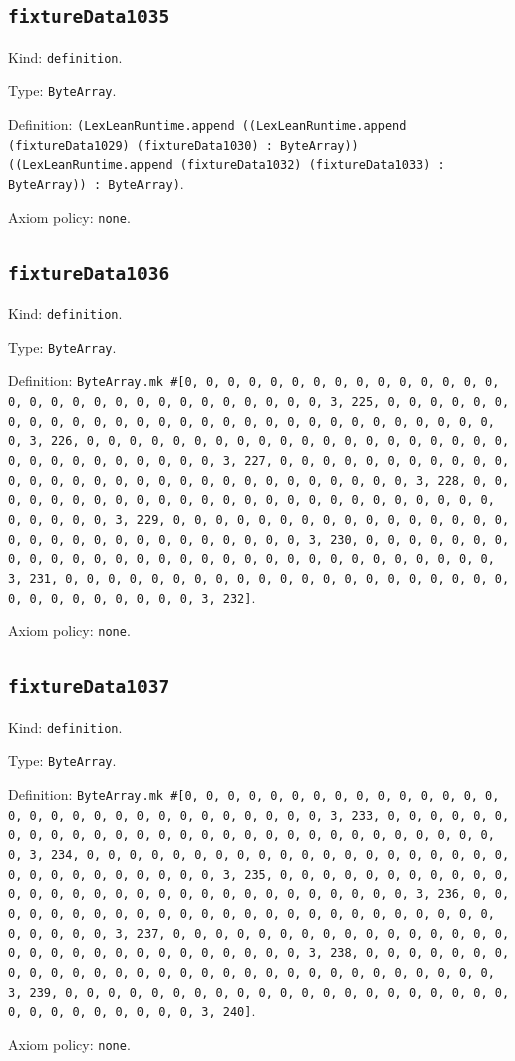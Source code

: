 \documentclass[11pt]{article}
\begin{document}
\subsection*{\texttt{fixtureData1035}}
\noindent Kind: \texttt{definition}.\par
\noindent Type: \texttt{ByteArray}.\par
\noindent Definition: \texttt{(LexLeanRuntime.append ((LexLeanRuntime.append (fixtureData1029) (fixtureData1030) : ByteArray)) ((LexLeanRuntime.append (fixtureData1032) (fixtureData1033) : ByteArray)) : ByteArray)}.\par
\noindent Axiom policy: \texttt{none}.\par
\subsection*{\texttt{fixtureData1036}}
\noindent Kind: \texttt{definition}.\par
\noindent Type: \texttt{ByteArray}.\par
\noindent Definition: \texttt{ByteArray.mk \#[0, 0, 0, 0, 0, 0, 0, 0, 0, 0, 0, 0, 0, 0, 0, 0, 0, 0, 0, 0, 0, 0, 0, 0, 0, 0, 0, 0, 0, 0, 3, 225, 0, 0, 0, 0, 0, 0, 0, 0, 0, 0, 0, 0, 0, 0, 0, 0, 0, 0, 0, 0, 0, 0, 0, 0, 0, 0, 0, 0, 0, 0, 3, 226, 0, 0, 0, 0, 0, 0, 0, 0, 0, 0, 0, 0, 0, 0, 0, 0, 0, 0, 0, 0, 0, 0, 0, 0, 0, 0, 0, 0, 0, 0, 3, 227, 0, 0, 0, 0, 0, 0, 0, 0, 0, 0, 0, 0, 0, 0, 0, 0, 0, 0, 0, 0, 0, 0, 0, 0, 0, 0, 0, 0, 0, 0, 3, 228, 0, 0, 0, 0, 0, 0, 0, 0, 0, 0, 0, 0, 0, 0, 0, 0, 0, 0, 0, 0, 0, 0, 0, 0, 0, 0, 0, 0, 0, 0, 3, 229, 0, 0, 0, 0, 0, 0, 0, 0, 0, 0, 0, 0, 0, 0, 0, 0, 0, 0, 0, 0, 0, 0, 0, 0, 0, 0, 0, 0, 0, 0, 3, 230, 0, 0, 0, 0, 0, 0, 0, 0, 0, 0, 0, 0, 0, 0, 0, 0, 0, 0, 0, 0, 0, 0, 0, 0, 0, 0, 0, 0, 0, 0, 3, 231, 0, 0, 0, 0, 0, 0, 0, 0, 0, 0, 0, 0, 0, 0, 0, 0, 0, 0, 0, 0, 0, 0, 0, 0, 0, 0, 0, 0, 0, 0, 3, 232]}.\par
\noindent Axiom policy: \texttt{none}.\par
\subsection*{\texttt{fixtureData1037}}
\noindent Kind: \texttt{definition}.\par
\noindent Type: \texttt{ByteArray}.\par
\noindent Definition: \texttt{ByteArray.mk \#[0, 0, 0, 0, 0, 0, 0, 0, 0, 0, 0, 0, 0, 0, 0, 0, 0, 0, 0, 0, 0, 0, 0, 0, 0, 0, 0, 0, 0, 0, 3, 233, 0, 0, 0, 0, 0, 0, 0, 0, 0, 0, 0, 0, 0, 0, 0, 0, 0, 0, 0, 0, 0, 0, 0, 0, 0, 0, 0, 0, 0, 0, 3, 234, 0, 0, 0, 0, 0, 0, 0, 0, 0, 0, 0, 0, 0, 0, 0, 0, 0, 0, 0, 0, 0, 0, 0, 0, 0, 0, 0, 0, 0, 0, 3, 235, 0, 0, 0, 0, 0, 0, 0, 0, 0, 0, 0, 0, 0, 0, 0, 0, 0, 0, 0, 0, 0, 0, 0, 0, 0, 0, 0, 0, 0, 0, 3, 236, 0, 0, 0, 0, 0, 0, 0, 0, 0, 0, 0, 0, 0, 0, 0, 0, 0, 0, 0, 0, 0, 0, 0, 0, 0, 0, 0, 0, 0, 0, 3, 237, 0, 0, 0, 0, 0, 0, 0, 0, 0, 0, 0, 0, 0, 0, 0, 0, 0, 0, 0, 0, 0, 0, 0, 0, 0, 0, 0, 0, 0, 0, 3, 238, 0, 0, 0, 0, 0, 0, 0, 0, 0, 0, 0, 0, 0, 0, 0, 0, 0, 0, 0, 0, 0, 0, 0, 0, 0, 0, 0, 0, 0, 0, 3, 239, 0, 0, 0, 0, 0, 0, 0, 0, 0, 0, 0, 0, 0, 0, 0, 0, 0, 0, 0, 0, 0, 0, 0, 0, 0, 0, 0, 0, 0, 0, 3, 240]}.\par
\noindent Axiom policy: \texttt{none}.\par
\end{document}
